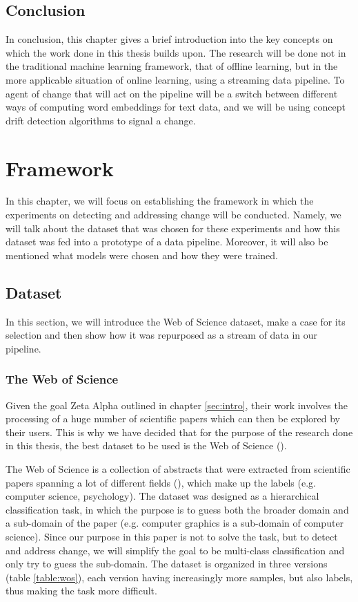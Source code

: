 \documentclass[12pt]{extreport}
\begin{document}
\section{Conclusion}

In conclusion, this chapter gives a brief introduction into the key concepts on which the work done in this thesis builds upon. The research will be done not in the traditional machine learning framework, that of offline learning, but in the more applicable situation of online learning, using a streaming data pipeline. To agent of change that will act on the pipeline will be a switch between different ways of computing word embeddings for text data, and we will be using concept drift detection algorithms to signal a change.

\chapter{Framework} \label{sec:framework}

In this chapter, we will focus on establishing the framework in which the experiments on detecting and addressing change will be conducted. Namely, we will talk about the dataset that was chosen for these experiments and how this dataset was fed into a prototype of a data pipeline. Moreover, it will also be mentioned what models were chosen and how they were trained.

\section{Dataset}

In this section, we will introduce the Web of Science dataset, make a case for its selection and then show how it was repurposed as a stream of data in our pipeline.

\subsection{The Web of Science} \label{wos}

Given the goal Zeta Alpha outlined in chapter \ref{sec:intro}, their work involves the processing of a huge number of scientific papers which can then be explored by their users. This is why we have decided that for the purpose of the research done in this thesis, the best dataset to be used is the Web of Science (\cite{wos}).

The Web of Science is a collection of abstracts that were extracted from scientific papers spanning a lot of different fields (\cite{wos}), which make up the labels (e.g. computer science, psychology). The dataset was designed as a hierarchical classification task, in which the purpose is to guess both the broader domain and a sub-domain of the paper (e.g. computer graphics is a sub-domain of computer science). Since our purpose in this paper is not to solve the task, but to detect and address change, we will simplify the goal to be multi-class classification and only try to guess the sub-domain. The dataset is organized in three versions (table \ref{table:wos}), each version having increasingly more samples, but also labels, thus making the task more difficult.
\end{document}
